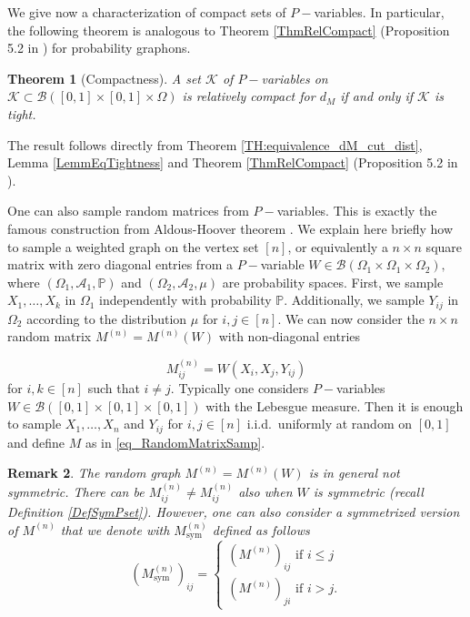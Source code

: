 \documentclass[11pt]{article}
\newtheorem{theorem}{Theorem}[section]
\newtheorem{remark}[theorem]{Remark}
\def\P{\mathbb{P}}
\newcommand{\cA}{{\mathcal A}}  %
\newcommand{\cB}{{\mathcal B}}  %
\renewcommand{\P}{\mathbb{P}}
\begin{document}
We give now a characterization of compact sets of $P-$variables. In particular, the following theorem is analogous to Theorem \ref{ThmRelCompact} (Proposition 5.2 in \cite{abraham2023probabilitygraphons}) for probability graphons.

\begin{theorem}[Compactness]
A set $\mathcal{K}$ of $P-$variables on $\mathcal{K}\subset \cB([0,1]\times[0,1]\times \Omega)$ is relatively compact for $d_M$ if and only if $\mathcal{K}$ is 
tight. 
\end{theorem}
\proof
The result follows directly from Theorem \ref{TH:equivalence_dM_cut_dist}, Lemma \ref{LemmEqTightness} and Theorem \ref{ThmRelCompact} (Proposition 5.2 in \cite{abraham2023probabilitygraphons}).
\endproof

One can also sample random matrices from $P-$variables. This is exactly the famous construction from Aldous-Hoover theorem \cite{hoover1979relations,aldous1981representations,aldous2010exchangeability}.
We explain here briefly how to sample a weighted graph on the vertex set $[n]$, or equivalently a $n\times n$ square matrix with zero diagonal entries from a $P-$variable $W\in \cB(\Omega_1\times\Omega_1\times \Omega_2 ),$ where $(\Omega_1,\cA_1,\P)$ and $(\Omega_2, \cA_2, \mu)$ are probability spaces. First, we sample $X_1,\ldots, X_k$ in $\Omega_1$ independently with probability $\mathbb{P}.$ Additionally, we sample $Y_{ij} $ in $\Omega_2$ according to the distribution $\mu$ for $i,j\in [n]$. We can now consider the $n\times n$ random matrix $M^{(n)}=M^{(n)}(W)$ with non-diagonal entries

\begin{equation}\label{eq_RandomMatrixSamp}
    M^{(n)}_{ij}=W(X_i,X_j,Y_{ij})
\end{equation}
for $i,k\in [n]$ such that $i\neq j.$
Typically one considers $P-$variables $W\in\cB([0,1]\times [0,1]\times [0,1])$ with the Lebesgue measure. Then it is enough to sample $X_1,\ldots, X_n$ and $Y_{ij}$ for $i,j\in [n]$ i.i.d.\ uniformly at random on $[0,1]$ and define $M$ as in \eqref{eq_RandomMatrixSamp}.

\begin{remark}\label{RmkMsym}
The random graph $M^{(n)}=M^{(n)}(W)$ is in general not symmetric. There can be $M^{(n)}_{ij}\neq M^{(n)}_{ij}$ also when $W$ is symmetric (recall Definition \ref{DefSymPset}). However, one can also consider a symmetrized version of $M^{(n)}$ that we denote with $M^{(n)}_{\text{sym}}$ defined as follows $$(M^{(n)}_{\text{sym}})_{ij}=\begin{cases}
    (M^{(n)})_{ij}  \text{  if } i\leq j\\
    (M^{(n)})_{ji} \text{  if } i>j.
\end{cases}$$
\end{remark}
\end{document}
